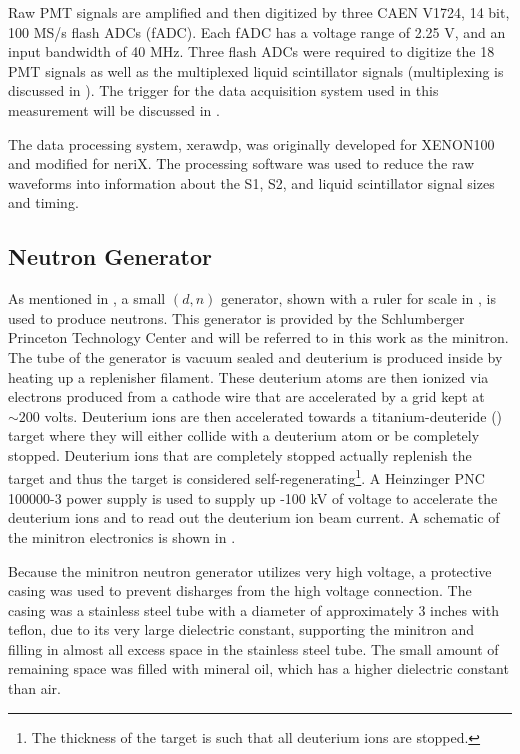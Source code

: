 Raw PMT signals are amplified and then digitized by three CAEN V1724, 14 bit, 100 MS/s flash ADCs (fADC).  Each fADC has a voltage range of 2.25 V, and an input bandwidth of 40 MHz.   Three flash ADCs were required to digitize the 18 PMT signals as well as the multiplexed liquid scintillator signals (multiplexing is discussed in ).  The trigger for the data acquisition system used in this measurement will be discussed in .

The data processing system, xerawdp, was originally developed for XENON100 \cite{guillaume_thesis} and modified for neriX.  The processing software was used to reduce the raw waveforms into information about the S1, S2, and liquid scintillator signal sizes and timing.  




\subsection{Neutron Generator}

As mentioned in , a small $(d, n)$ generator, shown with a ruler for scale in ,  is used to produce neutrons.  This generator is provided by the Schlumberger Princeton Technology Center and will be referred to in this work as the minitron.  The tube of the generator is vacuum sealed and deuterium is produced inside by heating up a replenisher filament.  These deuterium atoms are then ionized via electrons produced from a cathode wire that are accelerated by a grid kept at $\sim 200$ volts.  Deuterium ions are then accelerated towards a titanium-deuteride () target where they will either collide with a deuterium atom or be completely stopped.  Deuterium ions that are completely stopped actually replenish the target and thus the target is considered self-regenerating\footnote{The thickness of the target is such that all deuterium ions are stopped.}.  A Heinzinger PNC 100000-3 power supply is used to supply up -100 kV of voltage to accelerate the deuterium ions and to read out the deuterium ion beam current.  A schematic of the minitron electronics is shown in .

Because the minitron neutron generator utilizes very high voltage, a protective casing was used to prevent disharges from the high voltage connection. The casing was a stainless steel tube with a diameter of approximately 3 inches with teflon, due to its very large dielectric constant, supporting the minitron and filling in almost all excess space in the stainless steel tube.  The small amount of remaining space was filled with mineral oil, which has a higher dielectric constant than air.

